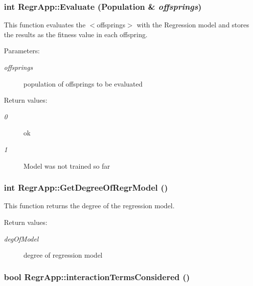 \subsubsection{\setlength{\rightskip}{0pt plus 5cm}int Regr\-App::Evaluate (Population \& {\em offsprings})}\label{classRegrApp_73425496f0f416efd7236e333b88e009}


This function evaluates the $<$offsprings$>$ with the Regression model and stores the results as the fitness value in each offspring. 

\begin{Desc}
\item[Parameters:]
\begin{description}
\item[{\em offsprings}]population of offsprings to be evaluated \end{description}
\end{Desc}
\begin{Desc}
\item[Return values:]
\begin{description}
\item[{\em 0}]ok \item[{\em 1}]Model was not trained so far \end{description}
\end{Desc}
\subsubsection{\setlength{\rightskip}{0pt plus 5cm}int Regr\-App::Get\-Degree\-Of\-Regr\-Model ()}\label{classRegrApp_122a5f31e8f5f5538e111cabc589d68b}


This function returns the degree of the regression model. 

\begin{Desc}
\item[Return values:]
\begin{description}
\item[{\em deg\-Of\-Model}]degree of regression model \end{description}
\end{Desc}
\subsubsection{\setlength{\rightskip}{0pt plus 5cm}bool Regr\-App::interaction\-Terms\-Considered ()}\label{classRegrApp_26e00c7d7555f4e0a3073af386d3556f}


